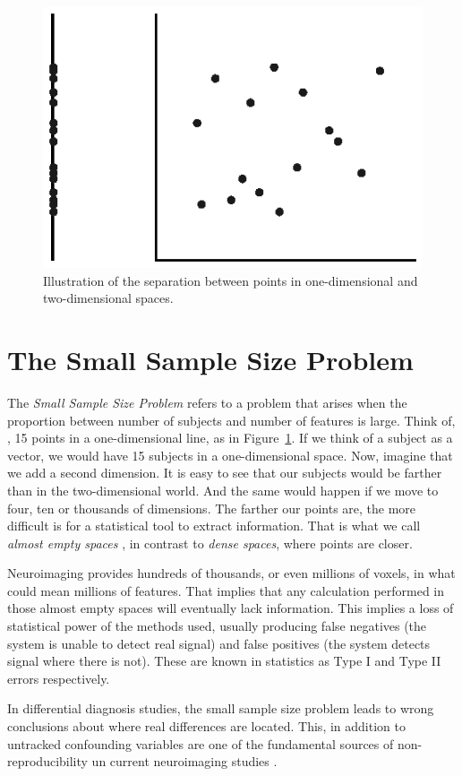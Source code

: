 \begin{figure}
\centering
\includegraphics[width=0.6\linewidth]{Graphics/ch1/smallsample}
\caption[Illustration of one and two-dimensional spaces.]{Illustration of the separation between points in one-dimensional and two-dimensional spaces.}
\label{fig:smallsample}
\end{figure}


\section{The Small Sample Size Problem}\label{sec:smallsamplesize}
The \textit{Small Sample Size Problem} refers to a problem that arises when the proportion between number of subjects and number of features is large. Think of, \eg, 15 points in a one-dimensional line, as in Figure~\ref{fig:smallsample}. If we think of a subject as a vector, we would have 15 subjects in a one-dimensional space. Now, imagine that we add a second dimension. It is easy to see that our subjects would be farther than in the two-dimensional world. And the same would happen if we move to four, ten or thousands of dimensions. The farther our points are, the more difficult is for a statistical tool to extract information. That is what we call \textit{almost empty spaces} \cite{Stoeckel04}, in contrast to \textit{dense spaces}, where points are closer. 

Neuroimaging provides hundreds of thousands, or even millions of voxels, in what could mean millions of features. That implies that any calculation performed in those almost empty spaces will eventually lack information. This implies a loss of statistical power of the methods used, usually producing false negatives (the system is unable to detect real signal) and false positives (the system detects signal where there is not). These are known in statistics as Type I and Type II errors respectively. 

In differential diagnosis studies, the small sample size problem leads to wrong conclusions about where real differences are located. This, in addition to untracked confounding variables are one of the fundamental sources of non-re\-pro\-du\-ci\-bi\-li\-ty un current neuroimaging studies \cite{Button2013}. 

